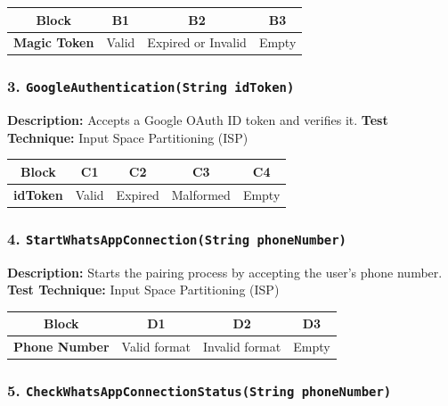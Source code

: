 \begin{table}[h!]
\centering
\begin{tabular}{|c|c|c|c|}
\hline
\textbf{Block} & \textbf{B1} & \textbf{B2} & \textbf{B3} \\
\hline
\textbf{Magic Token} & Valid & Expired or Invalid & Empty \\
\hline
\end{tabular}
\end{table}

\subsubsection*{3. \texttt{GoogleAuthentication(String idToken)}}

\textbf{Description:} Accepts a Google OAuth ID token and verifies it.  
\textbf{Test Technique:} Input Space Partitioning (ISP)

\begin{table}[h!]
\centering
\begin{tabular}{|c|c|c|c|c|}
\hline
\textbf{Block} & \textbf{C1} & \textbf{C2} & \textbf{C3} & \textbf{C4} \\
\hline
\textbf{idToken} & Valid & Expired & Malformed & Empty \\
\hline
\end{tabular}
\end{table}

\subsubsection*{4. \texttt{StartWhatsAppConnection(String phoneNumber)}}

\textbf{Description:} Starts the pairing process by accepting the user’s phone number.  
\textbf{Test Technique:} Input Space Partitioning (ISP)

\begin{table}[h!]
\centering
\begin{tabular}{|c|c|c|c|}
\hline
\textbf{Block} & \textbf{D1} & \textbf{D2} & \textbf{D3} \\
\hline
\textbf{Phone Number} & Valid format & Invalid format & Empty \\
\hline
\end{tabular}
\end{table}

\subsubsection*{5. \texttt{CheckWhatsAppConnectionStatus(String phoneNumber)}}

